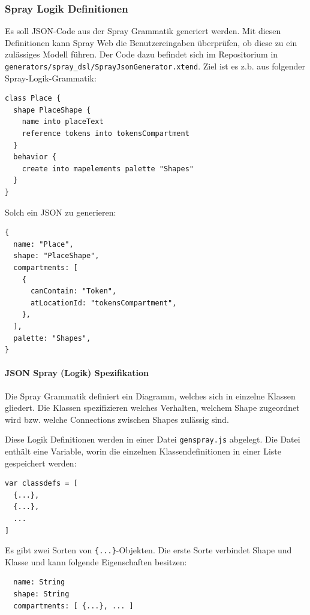 \subsubsection{Spray Logik Definitionen}

Es soll JSON-Code aus der Spray Grammatik generiert werden.
Mit diesen Definitionen kann Spray Web die Benutzereingaben überprüfen,
ob diese zu ein zulässiges Modell führen.
Der Code dazu befindet sich im Repositorium in
{\tt generators/spray\_dsl/SprayJsonGenerator.xtend}.
Ziel ist es z.b. aus folgender Spray-Logik-Grammatik:

\begin{verbatim}
class Place {
  shape PlaceShape {
    name into placeText
    reference tokens into tokensCompartment
  }
  behavior {
    create into mapelements palette "Shapes"
  }
} 
\end{verbatim}

\noindent Solch ein JSON zu generieren:

\begin{verbatim}
{
  name: "Place",
  shape: "PlaceShape",
  compartments: [
    {
      canContain: "Token",
      atLocationId: "tokensCompartment",
    },
  ],
  palette: "Shapes",
}
\end{verbatim}

\paragraph{JSON Spray (Logik) Spezifikation} Die Spray Grammatik definiert
ein Diagramm, welches sich in einzelne Klassen gliedert.
Die Klassen spezifizieren welches Verhalten, welchem Shape zugeordnet wird
bzw. welche Connections zwischen Shapes zulässig sind.

Diese Logik Definitionen werden in einer Datei {\tt genspray.js} abgelegt.
Die Datei enthält eine Variable, worin die einzelnen Klassendefinitionen
in einer Liste gespeichert werden:

\begin{verbatim}
var classdefs = [
  {...},
  {...},
  ...
]
\end{verbatim}

\noindent Es gibt zwei Sorten von \verb|{...}|-Objekten.
Die erste Sorte verbindet Shape und Klasse und kann
folgende Eigenschaften besitzen:

\begin{verbatim}
  name: String
  shape: String
  compartments: [ {...}, ... ]
\end{verbatim}

